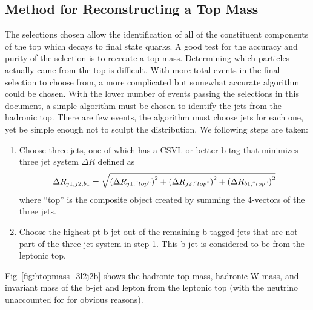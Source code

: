 	
	\subsection{Method for Reconstructing a Top Mass}
	The selections chosen allow the identification of all of the constituent components of the top which decays to final state quarks. A good test for the accuracy and purity of the selection is to recreate a top mass. Determining which  particles actually came from the top is difficult. With more total events in the final selection to choose from, a more complicated but somewhat accurate algorithm could be chosen. With the lower number of events passing the selections in this document, a simple algorithm must be chosen to identify the jets from the hadronic top. There are few events, the algorithm must choose jets for each one, yet be simple enough not to sculpt the distribution. We following steps are taken:
\begin{enumerate}
\item Choose three jets, one of which has a CSVL or better b-tag that minimizes three jet system $\Delta R$ defined as
\begin{equation}
\Delta R_{j1,j2,b1} = \sqrt{ \left(\Delta R_{j1, ``top"} \right) ^2 + \left(\Delta R_{j2, ``top"} \right) ^2 + \left(\Delta R_{b1, ``top"} \right) ^2 }
\end{equation}
where ``top'' is the composite object created by summing the 4-vectors of the three jets.
\item Choose the highest pt b-jet out of the remaining b-tagged jets that are not part of the three jet system in step 1. This b-jet is considered to be from the leptonic top.
\end{enumerate}

Fig~\ref{fig:htopmass_3l2j2b} shows the hadronic top mass, hadronic W mass, and invariant mass of the b-jet and lepton from the leptonic top (with the neutrino unaccounted for for obvious reasons).


